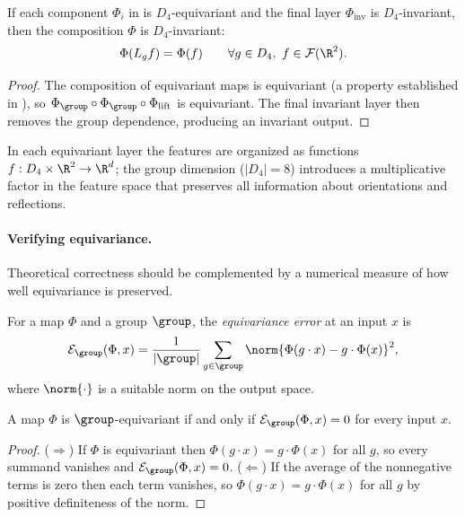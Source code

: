 \begin{theorem}
\label{thm:groups:composition-invariance}
If each component $\Phi_i$ in  is $D_4$-equivariant
and the final layer $\Phi_{\text{inv}}$ is $D_4$-invariant, then the composition
$\Phi$ is $D_4$-invariant:
\begin{equation}
  \Phi(L_g f) = \Phi(f) \qquad \forall g \in D_4,\ f \in \mathcal{F}(\R^2).
\end{equation}
\end{theorem}

\begin{proof}
The composition of equivariant maps is equivariant (a property established in
), so $\Phi_{\group} \circ \Phi_{\group} \circ \Phi_{\text{lift}}$
is equivariant. The final invariant layer then removes the group dependence,
producing an invariant output.
\end{proof}

In each equivariant layer the features are organized as functions $f: D_4 \times
\R^2 \to \R^d$; the group dimension ($|D_4| = 8$) introduces a multiplicative
factor in the feature space that preserves all information about orientations
and reflections.

\paragraph{Verifying equivariance.}
Theoretical correctness should be complemented by a numerical measure of how
well equivariance is preserved.

\begin{definition}
\label{def:groups:equivariance-error}
For a map $\Phi$ and a group $\group$, the \emph{equivariance error} at an input
$x$ is
\begin{equation}
  \mathcal{E}_{\group}(\Phi, x)
  = \frac{1}{|\group|} \sum_{g \in \group}
    \norm{\Phi(g \cdot x) - g \cdot \Phi(x)}^2,
\end{equation}
where $\norm{\cdot}$ is a suitable norm on the output space.
\end{definition}

\begin{theorem}
\label{thm:groups:equivariance-criterion}
A map $\Phi$ is $\group$-equivariant if and only if $\mathcal{E}_{\group}(\Phi,x)
= 0$ for every input $x$.
\end{theorem}

\begin{proof}
($\Rightarrow$) If $\Phi$ is equivariant then $\Phi(g \cdot x) = g \cdot
\Phi(x)$ for all $g$, so every summand vanishes and $\mathcal{E}_{\group}(\Phi,x)
= 0$. ($\Leftarrow$) If the average of the nonnegative terms is zero then each
term vanishes, so $\Phi(g \cdot x) = g \cdot \Phi(x)$ for all $g$ by positive
definiteness of the norm.
\end{proof}

